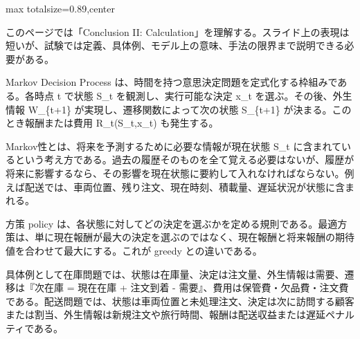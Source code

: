 \begin{minipage}[t]{0.58\textwidth}
\begin{adjustbox}{max totalsize={\textwidth}{0.89\textheight},center}
\begin{minipage}{\textwidth}\scriptsize
{}このページでは「Conclusion II: Calculation」を理解する。スライド上の表現は短いが、試験では定義、具体例、モデル上の意味、手法の限界まで説明できる必要がある。\par
Markov Decision Process は、時間を持つ意思決定問題を定式化する枠組みである。各時点 t で状態 S\_t を観測し、実行可能な決定 x\_t を選ぶ。その後、外生情報 W\_\{t+1\} が実現し、遷移関数によって次の状態 S\_\{t+1\} が決まる。このとき報酬または費用 R\_t(S\_t,x\_t) も発生する。\par
Markov性とは、将来を予測するために必要な情報が現在状態 S\_t に含まれているという考え方である。過去の履歴そのものを全て覚える必要はないが、履歴が将来に影響するなら、その影響を現在状態に要約して入れなければならない。例えば配送では、車両位置、残り注文、現在時刻、積載量、遅延状況が状態に含まれる。\par
方策 policy は、各状態に対してどの決定を選ぶかを定める規則である。最適方策は、単に現在報酬が最大の決定を選ぶのではなく、現在報酬と将来報酬の期待値を合わせて最大にする。これが greedy との違いである。\par
具体例として在庫問題では、状態は在庫量、決定は注文量、外生情報は需要、遷移は『次在庫 = 現在在庫 + 注文到着 - 需要』、費用は保管費・欠品費・注文費である。配送問題では、状態は車両位置と未処理注文、決定は次に訪問する顧客または割当、外生情報は新規注文や旅行時間、報酬は配送収益または遅延ペナルティである。\par

\end{minipage}
\end{adjustbox}
\end{minipage}
